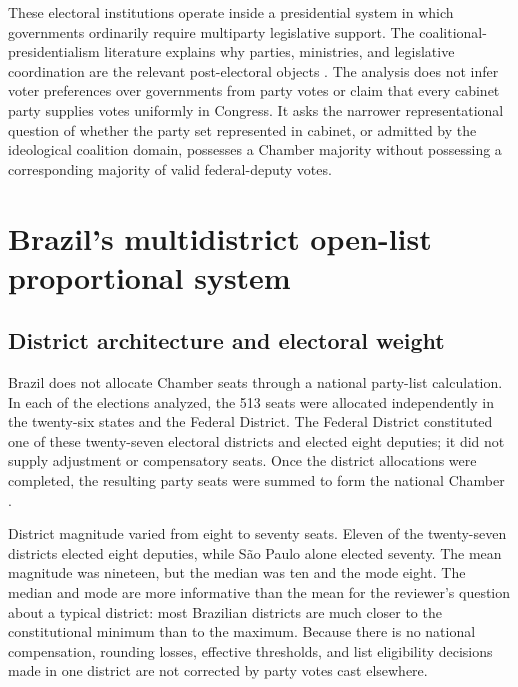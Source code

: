 \documentclass[11pt]{article}
\begin{document}
These electoral institutions operate inside a presidential system in which
governments ordinarily require multiparty legislative support. The
coalitional-presidentialism literature explains why parties, ministries, and
legislative coordination are the relevant post-electoral objects
\parencite{abranches1988presidencialismo,
figueiredo2000presidential,pereira2004cost}. The analysis does not infer
voter preferences over governments from party votes or claim that every
cabinet party supplies votes uniformly in Congress. It asks the narrower
representational question of whether the party set represented in cabinet,
or admitted by the ideological coalition domain, possesses a Chamber
majority without possessing a corresponding majority of valid
federal-deputy votes.
\section{Brazil's multidistrict open-list proportional system}
\label{sec:brazil-system}

\subsection{District architecture and electoral weight}

Brazil does not allocate Chamber seats through a national party-list
calculation. In each of the elections analyzed, the 513 seats were allocated
independently in the twenty-six states and the Federal District. The Federal
District constituted one of these twenty-seven electoral districts and elected
eight deputies; it did not supply adjustment or compensatory seats. Once the
district allocations were completed, the resulting party seats were summed to
form the national Chamber \parencite{camaraDeputadosNumeroEstados}.

District magnitude varied from eight to seventy seats. Eleven of the
twenty-seven districts elected eight deputies, while São Paulo alone elected
seventy. The mean magnitude was nineteen, but the median was ten and the
mode eight. The median and mode are more informative than the mean for the
reviewer's question about a typical district: most Brazilian districts are much
closer to the constitutional minimum than to the maximum. Because there is
no national compensation, rounding losses, effective thresholds, and list
eligibility decisions made in one district are not corrected by party votes cast
elsewhere.
\end{document}
